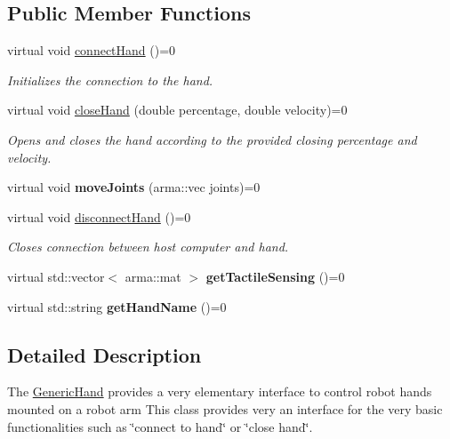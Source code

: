 \subsection*{Public Member Functions}
\begin{DoxyCompactItemize}
\item 
virtual void \hyperlink{classkukadu_1_1GenericHand_a965ed8a8d225fb36eabf5089fa5d4f32}{connect\-Hand} ()=0
\begin{DoxyCompactList}\small\item\em Initializes the connection to the hand. \end{DoxyCompactList}\item 
virtual void \hyperlink{classkukadu_1_1GenericHand_a000e4d03e93f50d7101c50e6096d28a0}{close\-Hand} (double percentage, double velocity)=0
\begin{DoxyCompactList}\small\item\em Opens and closes the hand according to the provided closing percentage and velocity. \end{DoxyCompactList}\item 
\hypertarget{classkukadu_1_1GenericHand_a7662305094e40833ef22e6675e41c5fd}{virtual void {\bfseries move\-Joints} (arma\-::vec joints)=0}\label{classkukadu_1_1GenericHand_a7662305094e40833ef22e6675e41c5fd}

\item 
virtual void \hyperlink{classkukadu_1_1GenericHand_a94c4a983aae8562bda7711a71baa7502}{disconnect\-Hand} ()=0
\begin{DoxyCompactList}\small\item\em Closes connection between host computer and hand. \end{DoxyCompactList}\item 
\hypertarget{classkukadu_1_1GenericHand_a85b4263bc45c19fb64fd167d58ca7e43}{virtual std\-::vector$<$ arma\-::mat $>$ {\bfseries get\-Tactile\-Sensing} ()=0}\label{classkukadu_1_1GenericHand_a85b4263bc45c19fb64fd167d58ca7e43}

\item 
\hypertarget{classkukadu_1_1GenericHand_a8ebf9a9353be157b8c8eace09ea7c872}{virtual std\-::string {\bfseries get\-Hand\-Name} ()=0}\label{classkukadu_1_1GenericHand_a8ebf9a9353be157b8c8eace09ea7c872}

\end{DoxyCompactItemize}


\subsection{Detailed Description}
The \hyperlink{classkukadu_1_1GenericHand}{Generic\-Hand} provides a very elementary interface to control robot hands mounted on a robot arm This class provides very an interface for the very basic functionalities such as \char`\"{}connect to hand\char`\"{} or \char`\"{}close hand\char`\"{}. 


